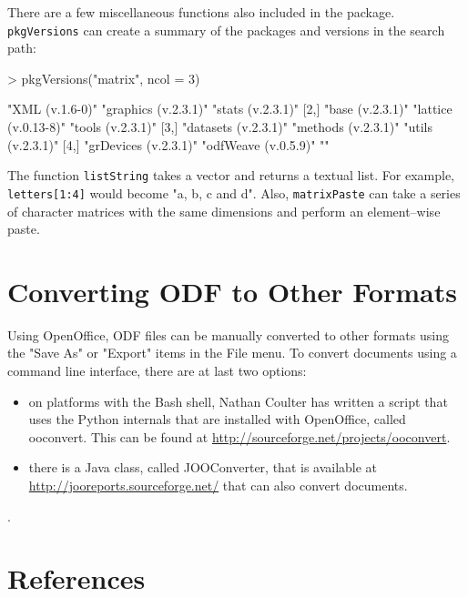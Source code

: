 \documentclass[12pt]{article}
\begin{document}
There are a few miscellaneous functions also included in the package. \texttt{pkgVersions} can create a summary of the packages and versions in the search path:
\begin{Schunk}
\begin{Sinput}
> pkgVersions("matrix", ncol = 3)
\end{Sinput}
\begin{Soutput}
     [,1]                  [,2]                 [,3]             
[1,] "XML (v.1.6-0)"       "graphics (v.2.3.1)" "stats (v.2.3.1)"
[2,] "base (v.2.3.1)"      "lattice (v.0.13-8)" "tools (v.2.3.1)"
[3,] "datasets (v.2.3.1)"  "methods (v.2.3.1)"  "utils (v.2.3.1)"
[4,] "grDevices (v.2.3.1)" "odfWeave (v.0.5.9)" ""               
\end{Soutput}
\end{Schunk}
The function \texttt{listString} takes a vector and returns a textual list. For example,  \verb|letters[1:4]| would become "a, b, c and d". Also, \texttt{matrixPaste} can take a series of character matrices with the same dimensions and perform an element--wise paste.

\section{Converting ODF to Other Formats}

Using OpenOffice, ODF files can be manually converted to other formats using the  "Save As" or "Export" items in the File menu. To convert documents using a command line interface, there are at last two options:
\begin{itemize}
\item on platforms with the Bash shell, Nathan Coulter has written a script that uses the Python internals that are installed with OpenOffice, called ooconvert. This can be found at \linebreak \href{http://sourceforge.net/projects/ooconvert} {http://sourceforge.net/projects/ooconvert}.
\item there is a Java class, called  JOOConverter, that is available at \href{http://jooreports.sourceforge.net/} {http://jooreports.sourceforge.net/} that can also convert documents.
\end{itemize}.



\section{References}
\end{document}

